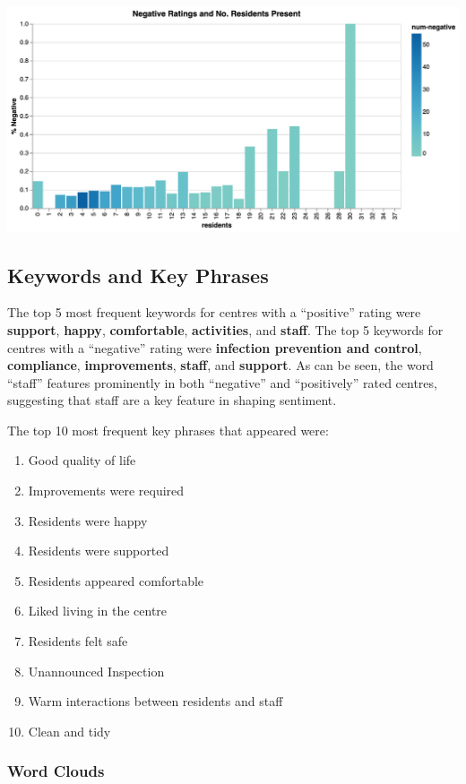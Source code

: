 \documentclass[a4paper,11pt,twoside]{article}
\begin{document}
\begin{center}
\includegraphics[width=.9\linewidth]{img/18_rating_res_neg.png}
\end{center}
\subsection{Keywords and Key Phrases}
\label{sec:org31a9aee}

The top 5 most frequent keywords for centres with a ``positive'' rating were \textbf{support}, \textbf{happy}, \textbf{comfortable}, \textbf{activities}, and \textbf{staff}. The top 5 keywords for centres with a ``negative'' rating were \textbf{infection prevention and control}, \textbf{compliance}, \textbf{improvements}, \textbf{staff}, and \textbf{support}. As can be seen, the word ``staff'' features prominently in both ``negative'' and ``positively'' rated centres, suggesting that staff are a key feature in shaping sentiment.

The top 10 most frequent key phrases that appeared were:

\begin{enumerate}
\item Good quality of life
\item Improvements were required
\item Residents were happy
\item Residents were supported
\item Residents appeared comfortable
\item Liked living in the centre
\item Residents felt safe
\item Unannounced Inspection
\item Warm interactions between residents and staff
\item Clean and tidy
\end{enumerate}
\subsubsection{Word Clouds}
\label{sec:orgd3473dc}
\end{document}

